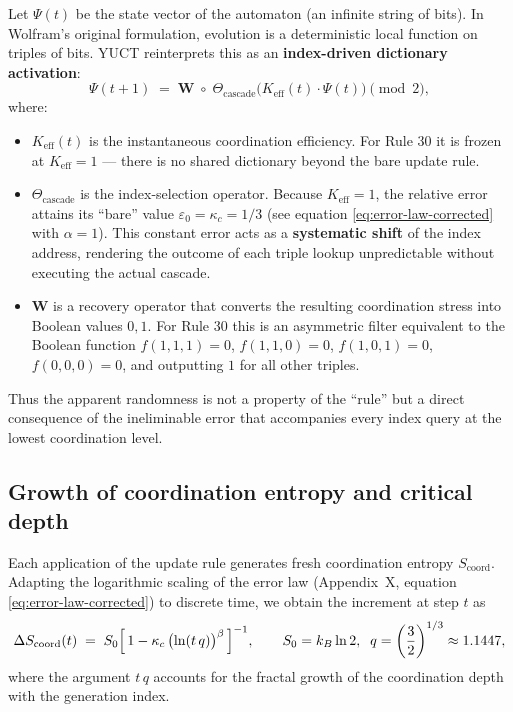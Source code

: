 \documentclass[11pt,a4paper]{article}
\newcommand{\Keff}{K_{\mathrm{eff}}}
\begin{document}
	Let \(\Psi(t)\) be the state vector of the automaton (an infinite string of bits). In Wolfram's original formulation, evolution is a deterministic local function on triples of bits. YUCT reinterprets this as an \textbf{index-driven dictionary activation}:
	\begin{equation}
		\Psi(t+1) \;=\; \mathbf{W}\;\circ\;
		\Theta_{\mathrm{cascade}}\!\bigl(\Keff(t)\cdot\Psi(t)\bigr)
		\pmod{2},
		\label{eq:rule30-ypsdc}
	\end{equation}
	where:
	\begin{itemize}
		\item \(\Keff(t)\) is the instantaneous coordination efficiency. For Rule 30 it is frozen at \(\Keff = 1\) — there is no shared dictionary beyond the bare update rule.
		\item \(\Theta_{\mathrm{cascade}}\) is the index-selection operator. Because \(\Keff=1\), the relative error attains its “bare” value \(\varepsilon_0 = \kappa_c = 1/3\) (see equation \eqref{eq:error-law-corrected} with \(\alpha=1\)). This constant error acts as a \textbf{systematic shift} of the index address, rendering the outcome of each triple lookup unpredictable without executing the actual cascade.
		\item \(\mathbf{W}\) is a recovery operator that converts the resulting coordination stress into Boolean values \(0,1\). For Rule 30 this is an asymmetric filter equivalent to the Boolean function \(f(1,1,1)=0\), \(f(1,1,0)=0\), \(f(1,0,1)=0\), \(f(0,0,0)=0\), and outputting \(1\) for all other triples.
	\end{itemize}
	Thus the apparent randomness is not a property of the “rule” but a direct consequence of the ineliminable error that accompanies every index query at the lowest coordination level.
	
	\subsection{Growth of coordination entropy and critical depth}
	\label{subsec:entropy-growth}
	
	Each application of the update rule generates fresh coordination entropy \(S_{\mathrm{coord}}\). Adapting the logarithmic scaling of the error law (Appendix~X, equation \eqref{eq:error-law-corrected}) to discrete time, we obtain the increment at step \(t\) as
	\begin{equation}
		\Delta S_{\mathrm{coord}}(t) \;=\;
		S_{0}\Bigl[\,1 - \kappa_c\,\bigl(\ln(t\,q)\bigr)^{\beta}\,\Bigr]^{-1},
		\qquad
		S_{0}=k_{B}\ln 2,\;\;
		q = \left(\frac{3}{2}\right)^{1/3}\approx 1.1447,
		\label{eq:deltaS}
	\end{equation}
	where the argument \(t\,q\) accounts for the fractal growth of the coordination depth with the generation index.
	
\end{document}
